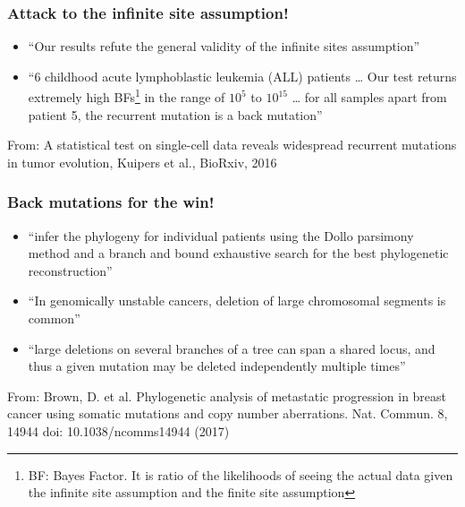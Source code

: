\begin{frame}
\frametitle{Attack to the infinite site assumption!}

\begin{itemize}
  \item
``Our results refute the general validity of
the infinite sites assumption''
  \item
``6 childhood
acute lymphoblastic leukemia (ALL) patients \ldots
Our test returns extremely high BFs\footnote{BF: Bayes Factor.
 It is ratio of the likelihoods of seeing the
  actual data given the infinite site assumption and the finite site assumption} in the
range 
of \alert{$10^{5}$} to \alert{$10^{15}$} \ldots
for all samples apart from patient 5, the recurrent
mutation is a \alert{back mutation}''
\end{itemize}

\vspace{1ex}
From: A statistical test on single-cell data reveals widespread
recurrent mutations in tumor evolution, Kuipers et al., BioRxiv, 2016
\end{frame}

\begin{frame}
\frametitle{Back mutations for the win!}

\begin{itemize}
  \item
``infer the phylogeny for individual patients using the \alert{Dollo parsimony}
method and a branch and bound exhaustive search for the best phylogenetic
reconstruction''
  \item
``In genomically unstable cancers, \alert{deletion of
  large chromosomal segments is common}''
  \item
``large deletions on
several branches of a tree can span a shared locus, and thus a given mutation may be \alert{deleted independently multiple
times}''
\end{itemize}

\vspace{1ex}
From:
Brown, D. et al. Phylogenetic analysis of metastatic progression
in breast cancer using somatic mutations and copy number aberrations. Nat. Commun.
8, 14944 doi: 10.1038/ncomms14944 (2017)
\end{frame}

